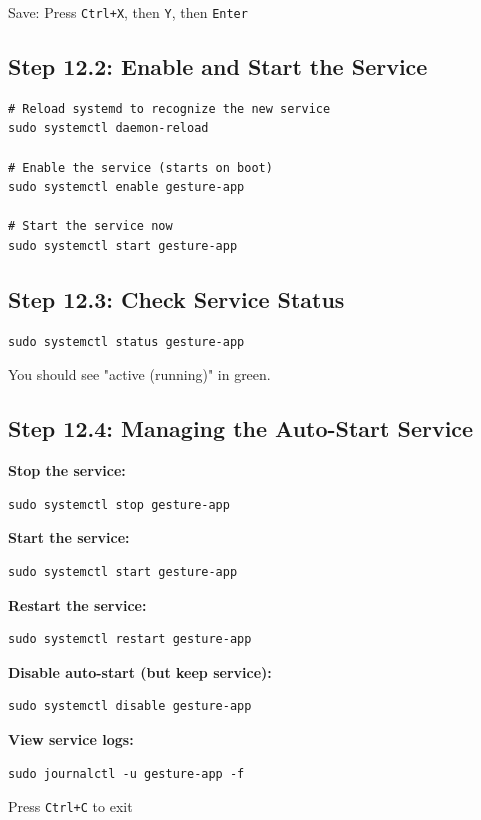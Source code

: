 \documentclass[12pt,a4paper]{article}
\begin{document}
Save: Press \texttt{Ctrl+X}, then \texttt{Y}, then \texttt{Enter}

\subsection{Step 12.2: Enable and Start the Service}

\begin{lstlisting}
# Reload systemd to recognize the new service
sudo systemctl daemon-reload

# Enable the service (starts on boot)
sudo systemctl enable gesture-app

# Start the service now
sudo systemctl start gesture-app
\end{lstlisting}

\subsection{Step 12.3: Check Service Status}

\begin{lstlisting}
sudo systemctl status gesture-app
\end{lstlisting}

You should see "active (running)" in green.

\subsection{Step 12.4: Managing the Auto-Start Service}

\textbf{Stop the service:}
\begin{lstlisting}
sudo systemctl stop gesture-app
\end{lstlisting}

\textbf{Start the service:}
\begin{lstlisting}
sudo systemctl start gesture-app
\end{lstlisting}

\textbf{Restart the service:}
\begin{lstlisting}
sudo systemctl restart gesture-app
\end{lstlisting}

\textbf{Disable auto-start (but keep service):}
\begin{lstlisting}
sudo systemctl disable gesture-app
\end{lstlisting}

\textbf{View service logs:}
\begin{lstlisting}
sudo journalctl -u gesture-app -f
\end{lstlisting}
Press \texttt{Ctrl+C} to exit
\end{document}

